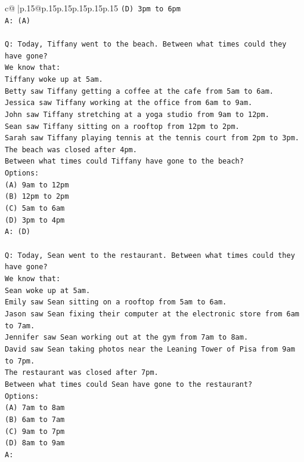 \documentclass{article}
\begin{document}
{\begin{supertabular}{c@{$\;$}|p{.15\linewidth}@{}p{.15\linewidth}p{.15\linewidth}p{.15\linewidth}p{.15\linewidth}p{.15\linewidth}}
{{{\texttt{(D) 3pm to 6pm} \\
\texttt{A: (A)} \\
\\ 
\texttt{Q: Today, Tiffany went to the beach. Between what times could they have gone?} \\
\texttt{We know that:} \\
\texttt{Tiffany woke up at 5am.} \\
\texttt{Betty saw Tiffany getting a coffee at the cafe from 5am to 6am.} \\
\texttt{Jessica saw Tiffany working at the office from 6am to 9am.} \\
\texttt{John saw Tiffany stretching at a yoga studio from 9am to 12pm.} \\
\texttt{Sean saw Tiffany sitting on a rooftop from 12pm to 2pm.} \\
\texttt{Sarah saw Tiffany playing tennis at the tennis court from 2pm to 3pm.} \\
\texttt{The beach was closed after 4pm.} \\
\texttt{Between what times could Tiffany have gone to the beach?} \\
\texttt{Options:} \\
\texttt{(A) 9am to 12pm} \\
\texttt{(B) 12pm to 2pm} \\
\texttt{(C) 5am to 6am} \\
\texttt{(D) 3pm to 4pm} \\
\texttt{A: (D)} \\
\\ 
\texttt{Q: Today, Sean went to the restaurant. Between what times could they have gone?} \\
\texttt{We know that:} \\
\texttt{Sean woke up at 5am.} \\
\texttt{Emily saw Sean sitting on a rooftop from 5am to 6am.} \\
\texttt{Jason saw Sean fixing their computer at the electronic store from 6am to 7am.} \\
\texttt{Jennifer saw Sean working out at the gym from 7am to 8am.} \\
\texttt{David saw Sean taking photos near the Leaning Tower of Pisa from 9am to 7pm.} \\
\texttt{The restaurant was closed after 7pm.} \\
\texttt{Between what times could Sean have gone to the restaurant?} \\
\texttt{Options:} \\
\texttt{(A) 7am to 8am} \\
\texttt{(B) 6am to 7am} \\
\texttt{(C) 9am to 7pm} \\
\texttt{(D) 8am to 9am} \\
\texttt{A:} \\
            }
        }
    }
     \\ \\


\end{supertabular}}
\end{document}
